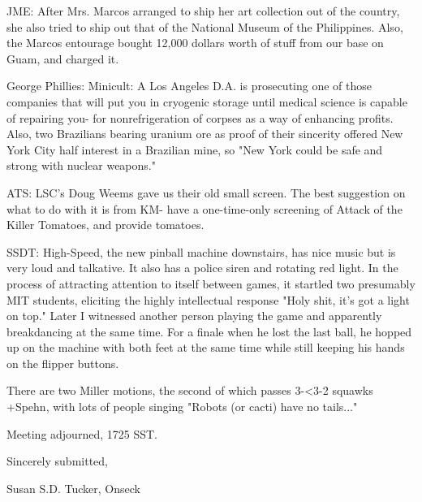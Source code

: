 \documentclass[12pt]{article}
\begin{document}
JME: After Mrs. Marcos arranged to ship her art collection out of the country, she also tried to ship out that of the National Museum of the Philippines. Also, the Marcos entourage bought 12,000 dollars worth of stuff from our base on Guam, and charged it.

George Phillies: Minicult: A Los Angeles D.A. is prosecuting one of those companies that will put you in cryogenic storage until medical science is capable of repairing you- for nonrefrigeration of corpses as a way of enhancing profits. Also, two Brazilians bearing uranium ore as proof of their sincerity offered New York City half interest in a Brazilian mine, so "New York could be safe and strong with nuclear weapons."

ATS: LSC's Doug Weems gave us their old small screen. The best suggestion on what to do with it is from KM- have a one-time-only screening of Attack of the Killer Tomatoes, and provide tomatoes.

SSDT: High-Speed, the new pinball machine downstairs, has nice music but is very loud and talkative. It also has a police siren and rotating red light. In the process of attracting attention to itself between games, it startled two presumably MIT students, eliciting the highly intellectual response "Holy shit, it's got a light on top." Later I witnessed another person playing the game and apparently breakdancing at the same time. For a finale when he lost the last ball, he hopped up on the machine with both feet at the same time while still keeping his hands on the flipper buttons.

There are two Miller motions, the second of which passes 3-<3-2 squawks +Spehn, with lots of people singing "Robots (or cacti) have no tails..."

\vspace{12pt}

\noindent
Meeting adjourned, 1725 SST.

\vspace{18pt}

\centerline{Sincerely submitted,}
\centerline{Susan S.D. Tucker, Onseck}
\end{document}
